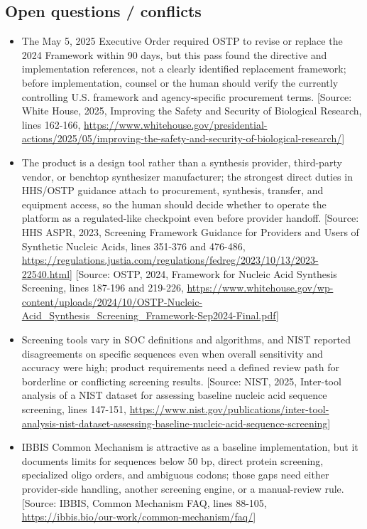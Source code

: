\documentclass[11pt]{report}
\begin{document}
\subsection{Open questions / conflicts}
\begin{itemize}
\item The May 5, 2025 Executive Order required OSTP to revise or replace the 2024 Framework within 90 days, but this pass found the directive and implementation references, not a clearly identified replacement framework; before implementation, counsel or the human should verify the currently controlling U.S. framework and agency-specific procurement terms. [Source: White House, 2025, Improving the Safety and Security of Biological Research, lines 162-166, \url{https://www.whitehouse.gov/presidential-actions/2025/05/improving-the-safety-and-security-of-biological-research/}]
\item The product is a design tool rather than a synthesis provider, third-party vendor, or benchtop synthesizer manufacturer; the strongest direct duties in HHS/OSTP guidance attach to procurement, synthesis, transfer, and equipment access, so the human should decide whether to operate the platform as a regulated-like checkpoint even before provider handoff. [Source: HHS ASPR, 2023, Screening Framework Guidance for Providers and Users of Synthetic Nucleic Acids, lines 351-376 and 476-486, \url{https://regulations.justia.com/regulations/fedreg/2023/10/13/2023-22540.html}] [Source: OSTP, 2024, Framework for Nucleic Acid Synthesis Screening, lines 187-196 and 219-226, \url{https://www.whitehouse.gov/wp-content/uploads/2024/10/OSTP-Nucleic-Acid_Synthesis_Screening_Framework-Sep2024-Final.pdf}]
\item Screening tools vary in SOC definitions and algorithms, and NIST reported disagreements on specific sequences even when overall sensitivity and accuracy were high; product requirements need a defined review path for borderline or conflicting screening results. [Source: NIST, 2025, Inter-tool analysis of a NIST dataset for assessing baseline nucleic acid sequence screening, lines 147-151, \url{https://www.nist.gov/publications/inter-tool-analysis-nist-dataset-assessing-baseline-nucleic-acid-sequence-screening}]
\item IBBIS Common Mechanism is attractive as a baseline implementation, but it documents limits for sequences below 50 bp, direct protein screening, specialized oligo orders, and ambiguous codons; those gaps need either provider-side handling, another screening engine, or a manual-review rule. [Source: IBBIS, Common Mechanism FAQ, lines 88-105, \url{https://ibbis.bio/our-work/common-mechanism/faq/}]

\end{itemize}
\end{document}
